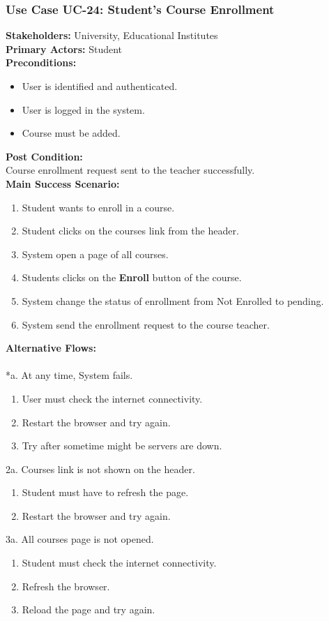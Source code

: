 \documentclass[12pt]{article}
\begin{document}
\subsubsection{Use Case UC-24: Student's Course Enrollment}
\textbf{Stakeholders: } University, Educational Institutes \\
\textbf{Primary Actors: }Student \\
\textbf{Preconditions:}
\begin{itemize}
\item User is identified and authenticated.
\item User is logged in the system.
\item Course must be added.
\end{itemize}
\textbf{Post Condition: }\\
Course enrollment request sent to the teacher successfully.\\
\textbf{Main Success Scenario:}
\begin{enumerate}
\item Student wants to enroll in a course.
\item Student clicks on the courses link from the header.
\item System open a page of all courses.
\item Students clicks on the \textbf{Enroll} button of the course.
\item System change the status of enrollment from Not Enrolled to pending.
\item System send the enrollment request to the course teacher.
\end{enumerate}
\textbf{Alternative Flows:}\\
\\
*a. At any time, System fails.
\begin{enumerate}
\item User must check the internet connectivity.
\item Restart the browser and try again.
\item Try after sometime might be servers are down.
\end{enumerate}
2a. Courses link is not shown on the header.
\begin{enumerate}
\item Student must have to refresh the page.
\item Restart the browser and try again.
\end{enumerate} 
3a. All courses page is not opened.
\begin{enumerate}
\item Student must check the internet connectivity.
\item Refresh the browser.
\item Reload the page and try again.
\end{enumerate}
\end{document}
